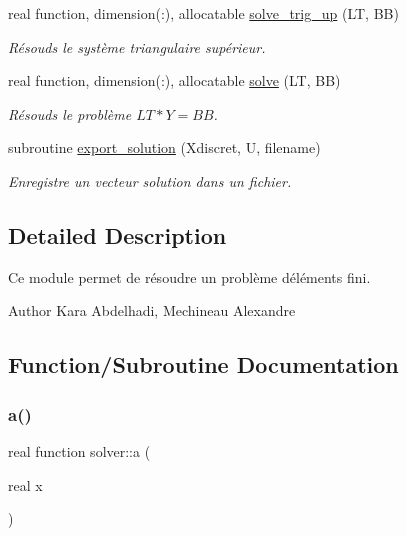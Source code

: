 \begin{DoxyCompactItemize}
real function, dimension(\+:), allocatable \hyperlink{namespacesolver_a08b8f70c86d7bf39b32ce8fdcc872fd4}{solve\+\_\+trig\+\_\+up} (LT, BB)
\begin{DoxyCompactList}\small\item\em Résouds le système triangulaire supérieur. \end{DoxyCompactList}\item 
real function, dimension(\+:), allocatable \hyperlink{namespacesolver_af3691d2059a024a82bab7751a99e6006}{solve} (LT, BB)
\begin{DoxyCompactList}\small\item\em Résouds le problème $ LT*Y = BB$. \end{DoxyCompactList}\item 
subroutine \hyperlink{namespacesolver_a2456ddba19a0992671f59ac396d4c1f1}{export\+\_\+solution} (Xdiscret, U, filename)
\begin{DoxyCompactList}\small\item\em Enregistre un vecteur solution dans un fichier. \end{DoxyCompactList}\end{DoxyCompactItemize}


\subsection{Detailed Description}
Ce module permet de résoudre un problème d\textquotesingle{}éléments fini. 

\begin{DoxyAuthor}{Author}
Kara Abdelhadi, Mechineau Alexandre 
\end{DoxyAuthor}


\subsection{Function/\+Subroutine Documentation}
\mbox{\label{namespacesolver_ab0081bb7880652eb26e65994f13fcb54}} 
\subsubsection{\texorpdfstring{a()}{a()}}
{\footnotesize\ttfamily real function solver\+::a (\begin{DoxyParamCaption}\item[{real}]{x }\end{DoxyParamCaption})}



